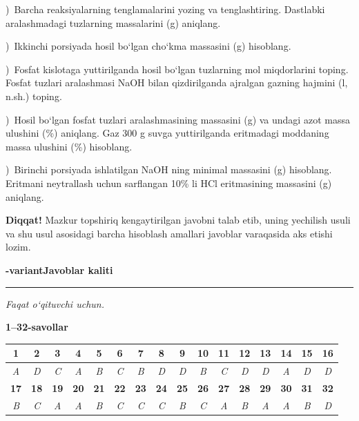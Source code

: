 \documentclass[11pt,a4paper]{article}
\newcommand{\qsep}{\par\vspace{13pt}}
\newcommand{\diqqat}[1]{\par\smallskip\noindent\textbf{Diqqat!} #1\par\medskip}
\begin{document}
)\ Barcha reaksiyalarning tenglamalarini yozing va tenglashtiring. Dastlabki aralashmadagi tuzlarning massalarini (g) aniqlang.\par
{})\ Ikkinchi porsiyada hosil bo`lgan cho`kma massasini (g) hisoblang.\par
{})\ Fosfat kislotaga yuttirilganda hosil bo`lgan tuzlarning mol miqdorlarini toping. Fosfat tuzlari aralashmasi NaOH bilan qizdirilganda ajralgan gazning hajmini (l, n.sh.) toping.\par
{})\ Hosil bo`lgan fosfat tuzlari aralashmasining massasini (g) va undagi azot massa ulushini (\%) aniqlang. Gaz 300 g suvga yuttirilganda eritmadagi moddaning massa ulushini (\%) hisoblang.\par
{})\ Birinchi porsiyada ishlatilgan NaOH ning minimal massasini (g) hisoblang. Eritmani neytrallash uchun sarflangan 10\% li HCl eritmasining massasini (g) aniqlang.\par
\diqqat{Mazkur topshiriq kengaytirilgan javobni talab etib, uning yechilish usuli va shu usul asosidagi barcha hisoblash amallari javoblar varaqasida aks etishi lozim.}\qsep
\newpage
\noindent\textbf{\fontsize{13}{15}-variant}\hfill \textbf{Javoblar kaliti}\par\smallskip\hrule\smallskip
\textit{Faqat o`qituvchi uchun.}\par\medskip
\noindent\textbf{1--32-savollar}\par\smallskip
\noindent\begin{tabular}{|c|c|c|c|c|c|c|c|c|c|c|c|c|c|c|c|}\hline
\textbf{1} & \textbf{2} & \textbf{3} & \textbf{4} & \textbf{5} & \textbf{6} & \textbf{7} & \textbf{8} & \textbf{9} & \textbf{10} & \textbf{11} & \textbf{12} & \textbf{13} & \textbf{14} & \textbf{15} & \textbf{16}\\\hline
\textsl{A} & \textsl{D} & \textsl{C} & \textsl{A} & \textsl{B} & \textsl{C} & \textsl{B} & \textsl{D} & \textsl{D} & \textsl{B} & \textsl{C} & \textsl{D} & \textsl{D} & \textsl{A} & \textsl{D} & \textsl{D}\\\hline
\textbf{17} & \textbf{18} & \textbf{19} & \textbf{20} & \textbf{21} & \textbf{22} & \textbf{23} & \textbf{24} & \textbf{25} & \textbf{26} & \textbf{27} & \textbf{28} & \textbf{29} & \textbf{30} & \textbf{31} & \textbf{32}\\\hline
\textsl{B} & \textsl{C} & \textsl{A} & \textsl{A} & \textsl{B} & \textsl{C} & \textsl{C} & \textsl{C} & \textsl{B} & \textsl{C} & \textsl{A} & \textsl{B} & \textsl{A} & \textsl{A} & \textsl{B} & \textsl{D}\\\hline
\end{tabular}\par\medskip
\end{document}
